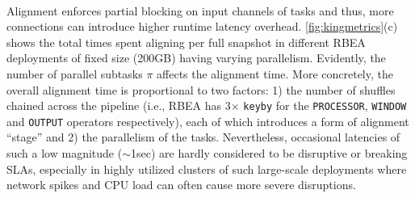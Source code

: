  \\
Alignment enforces partial blocking on input channels of tasks and thus, more connections can introduce higher runtime latency overhead. \autoref{fig:kingmetrics}(c) shows the total times spent aligning per full snapshot in different RBEA deployments of fixed size (200GB) having varying parallelism. Evidently, the number of parallel subtasks $\pi$ affects the alignment time. More concretely, the overall alignment time is proportional to two factors: 1) the number of shuffles chained across the pipeline (i.e., RBEA has 3$\times$ \texttt{keyby} for the \texttt{PROCESSOR}, \texttt{WINDOW} and \texttt{OUTPUT} operators respectively), each of which introduces a form of alignment ``stage'' and 2) the parallelism of the tasks. Nevertheless, occasional latencies of such a low magnitude ($\sim$1sec) are hardly considered to be disruptive or breaking SLAs, especially in highly utilized clusters of such large-scale deployments where network spikes and CPU load can often cause more severe disruptions.



